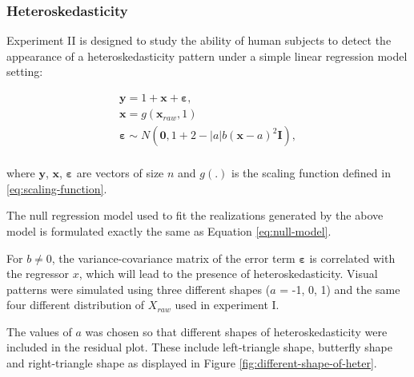 \documentclass[]{interact}
\theoremstyle{plain}%
\theoremstyle{definition}
\theoremstyle{remark}
\begin{document}
\hypertarget{heteroskedasticity}{%
\subsubsection{Heteroskedasticity}\label{heteroskedasticity}}

Experiment II is designed to study the ability of human subjects to
detect the appearance of a heteroskedasticity pattern under a simple
linear regression model setting:

\begin{align} \label{eq:heter-model}
\boldsymbol{y} = 1 + \boldsymbol{x} + \boldsymbol{\varepsilon},\\
\boldsymbol{x} = g(\boldsymbol{x}_{raw}, 1)\\
\boldsymbol{\varepsilon} \sim N(\boldsymbol{0}, 1 + 2 - |a| b (\boldsymbol{x} - a)^2 \boldsymbol{I}), \\
\end{align}

where \(\boldsymbol{y}\), \(\boldsymbol{x}\),
\(\boldsymbol{\varepsilon}\) are vectors of size \(n\) and \(g(.)\) is
the scaling function defined in \ref{eq:scaling-function}.

The null regression model used to fit the realizations generated by the
above model is formulated exactly the same as Equation
\ref{eq:null-model}.

For \(b \neq 0\), the variance-covariance matrix of the error term
\(\boldsymbol{\varepsilon}\) is correlated with the regressor \(x\),
which will lead to the presence of heteroskedasticity. Visual patterns
were simulated using three different shapes (\(a\) = -1, 0, 1) and the
same four different distribution of \(X_{raw}\) used in experiment I.

The values of \(a\) was chosen so that different shapes of
heteroskedasticity were included in the residual plot. These include
left-triangle shape, butterfly shape and right-triangle shape as
displayed in Figure \ref{fig:different-shape-of-heter}.
\end{document}
